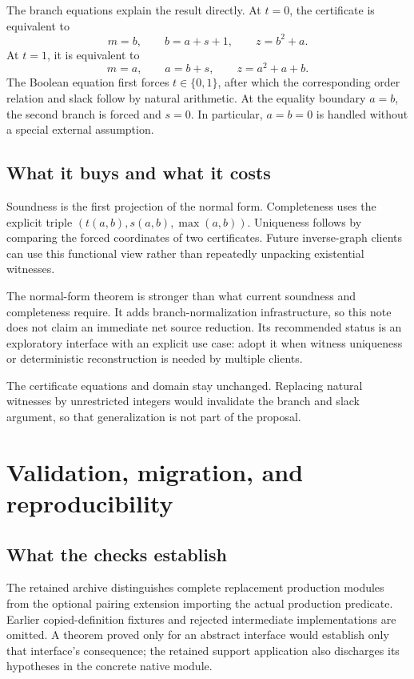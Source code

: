 \documentclass[11pt]{article}
\theoremstyle{remark}\newtheorem{remark}[proposition]{Remark}
\begin{document}
The branch equations explain the result directly. At \(t=0\), the certificate is equivalent to
\[
 m=b,\qquad b=a+s+1,\qquad z=b^2+a.
\]
At \(t=1\), it is equivalent to
\[
 m=a,\qquad a=b+s,\qquad z=a^2+a+b.
\]
The Boolean equation first forces \(t\in\{0,1\}\), after which the corresponding order relation and slack follow by natural arithmetic. At the equality boundary \(a=b\), the second branch is forced and \(s=0\). In particular, \(a=b=0\) is handled without a special external assumption.

\subsection{What it buys and what it costs}

Soundness is the first projection of the normal form. Completeness uses the explicit triple \((t(a,b),s(a,b),\max(a,b))\). Uniqueness follows by comparing the forced coordinates of two certificates. Future inverse-graph clients can use this functional view rather than repeatedly unpacking existential witnesses.

The normal-form theorem is stronger than what current soundness and completeness require. It adds branch-normalization infrastructure, so this note does not claim an immediate net source reduction. Its recommended status is an exploratory interface with an explicit use case: adopt it when witness uniqueness or deterministic reconstruction is needed by multiple clients.

\PairingStatus

The certificate equations and domain stay unchanged. Replacing natural witnesses by unrestricted integers would invalidate the branch and slack argument, so that generalization is not part of the proposal.

\section{Validation, migration, and reproducibility}\label{sec:validation}

\subsection{What the checks establish}

\ValidationSummary

The retained archive distinguishes complete replacement production modules from the optional pairing extension importing the actual production predicate. Earlier copied-definition fixtures and rejected intermediate implementations are omitted. A theorem proved only for an abstract interface would establish only that interface's consequence; the retained support application also discharges its hypotheses in the concrete native module.
\end{document}
